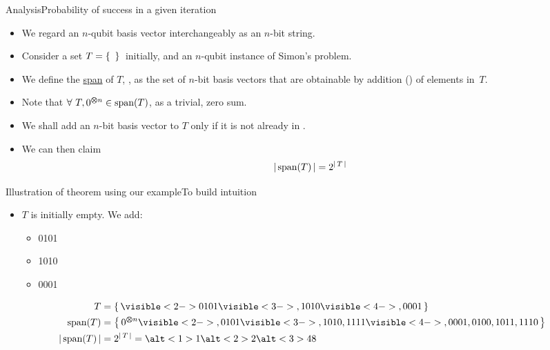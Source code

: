 


\begin{frame}{Analysis}{Probability of success in a given iteration}

\begin{itemize}
    \item We regard an $n$-qubit basis vector interchangeably as an $n$-bit string.
    \item Consider a set $T=\left\{\,\,\,\right\}{}$ initially, and an $n$-qubit instance of Simon's problem.
    \item We define the \href{https://en.wikipedia.org/wiki/Linear_span}{span} of $T$, , as the set of $n$-bit basis vectors that are obtainable by addition (\Xor{}{}) of elements in~$T$.  
    \item Note that $\forall\ T, 0^{\bm{\otimes} n} \in {\mbox{span}(T)}$, as a trivial, zero sum.
    \item We shall add an $n$-bit basis vector to $T$ only if it is not already in .
    \item We can then claim 
    \[{|\,{\mbox{span}(T)}\,|} = 2^{{|\,T\,|}}\]
\end{itemize}
    
\end{frame}

\begin{frame}{Illustration of theorem using our example}{To build intuition}
\begin{itemize}
    \item<1-> $T$ is initially empty.  We add:
    \begin{itemize}
    \item<2-> 0101
    \item<3-> 1010
    \item<4-> 0001
    \end{itemize}
\end{itemize}

\begin{align*}
T &= \Set{
\visible<2->{0101}
\visible<3->{, 1010}
\visible<4->{, 0001}
} \\
\Span{T} &= \Set{
\TensSupProd{0}{n}%
\visible<2->{, 0101}
\visible<3->{, 1010, 1111}
\visible<4->{, 0001, 0100, 1011, 1110}
} \\
\Mag{\Span{T}} &= 2^\Mag{T} = \alt<1>{1}{\alt<2>{2}{\alt<3>{4}{8}}}
\end{align*}

\end{frame}

